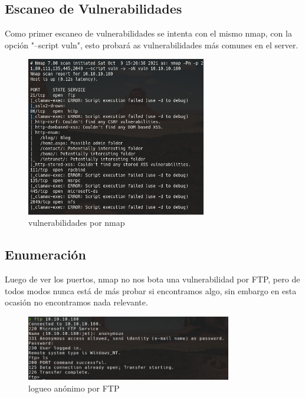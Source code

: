 \documentclass{article}
\begin{document}
\subsection{Escaneo de Vulnerabilidades}

Como primer escaneo de vulnerabilidades se intenta con el mismo nmap, con la opción "--script vuln", esto probará as vulnerabilidades más comunes en el server.

\begin{figure}[h]
	\center
	\includegraphics[width=0.7\textwidth]{images/remote/nmap_vuln.png}
	\caption{vulnerabilidades por nmap}
\end{figure}
\subsection{Enumeración}

Luego de ver los puertos, nmap no nos bota una vulnerabilidad por FTP, pero de todos modos nunca está de más probar si encontramos algo, sin embargo en esta ocasión no encontramos nada relevante.
\begin{figure}[h]
	\center 
	\includegraphics[width=0.8\textwidth]{images/remote/ftp.png}
	\caption{logueo anónimo por FTP}
\end{figure}
\end{document}
